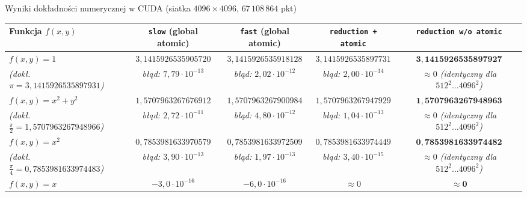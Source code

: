\documentclass[aspectratio=169, 10pt, xcolor={table}]{beamer}
\begin{document}
\begin{frame}{Wyniki dokładności numerycznej w CUDA (siatka $4096 \times 4096$, $67\,108\,864$ pkt)}
  \begin{table}
    \centering
    \scriptsize
    \begin{tabular}{@{} l c c c c @{}}
      \toprule
      \textbf{Funkcja $f(x,y)$} & \textbf{\texttt{slow} (global atomic)} & \textbf{\texttt{fast} (global atomic)} & \textbf{\texttt{reduction + atomic}} & \textbf{\texttt{reduction w/o atomic}} \\
      \midrule
      $f(x,y) = 1$ & $3{,}1415926535905720$ & $3{,}1415926535918128$ & $3{,}1415926535897731$ & \cellcolor{RowHighlight}$\mathbf{3{,}1415926535897927}$ \\
      \textit{\scriptsize (dokł. $\pi = 3{,}1415926535897931$)} & \textit{\scriptsize błąd: $7{,}79 \cdot 10^{-13}$} & \textit{\scriptsize błąd: $2{,}02 \cdot 10^{-12}$} & \textit{\scriptsize błąd: $2{,}00 \cdot 10^{-14}$} & \cellcolor{RowHighlight}\textit{\scriptsize $\approx 0$ (identyczny dla $512^2\dots 4096^2$)} \\
      \midrule
      $f(x,y) = x^2 + y^2$ & $1{,}5707963267676912$ & $1{,}5707963267900984$ & $1{,}5707963267947929$ & \cellcolor{RowHighlight}$\mathbf{1{,}5707963267948963}$ \\
      \textit{\scriptsize (dokł. $\frac{\pi}{2} = 1{,}5707963267948966$)} & \textit{\scriptsize błąd: $2{,}72 \cdot 10^{-11}$} & \textit{\scriptsize błąd: $4{,}80 \cdot 10^{-12}$} & \textit{\scriptsize błąd: $1{,}04 \cdot 10^{-13}$} & \cellcolor{RowHighlight}\textit{\scriptsize $\approx 0$ (identyczny dla $512^2\dots 4096^2$)} \\
      \midrule
      $f(x,y) = x^2$ & $0{,}7853981633970579$ & $0{,}7853981633972509$ & $0{,}7853981633974449$ & \cellcolor{RowHighlight}$\mathbf{0{,}7853981633974482}$ \\
      \textit{\scriptsize (dokł. $\frac{\pi}{4} = 0{,}7853981633974483$)} & \textit{\scriptsize błąd: $3{,}90 \cdot 10^{-13}$} & \textit{\scriptsize błąd: $1{,}97 \cdot 10^{-13}$} & \textit{\scriptsize błąd: $3{,}40 \cdot 10^{-15}$} & \cellcolor{RowHighlight}\textit{\scriptsize $\approx 0$ (identyczny dla $512^2\dots 4096^2$)} \\
      \midrule
      $f(x,y) = x$ & $-3{,}0 \cdot 10^{-16}$ & $-6{,}0 \cdot 10^{-16}$ & $\approx 0$ & \cellcolor{RowHighlight}$\mathbf{\approx 0}$ \\

\end{tabular}
\end{table}
\end{frame}
\end{document}

